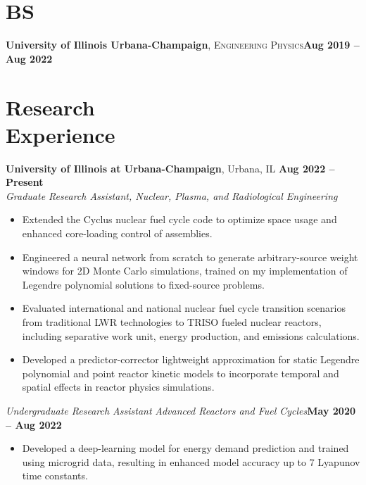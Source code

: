 \documentclass[margin,line]{resume}
\begin{document}
\begin{resume}
    \section{\mysidestyle BS}
    \textbf{University of Illinois Urbana-Champaign}, \textsc{Engineering Physics}\hfill\textbf{Aug 2019 -- Aug 2022}\vspace{-3mm}\\\vspace{-1mm}%
    \vspace{-1.5mm}

\section{\mysidestyle Research\\Experience}
\textbf{University of Illinois at Urbana-Champaign}, Urbana, IL \hfill \textbf{Aug 2022 -- Present} \\
\textsl{Graduate Research Assistant, Nuclear, Plasma, and Radiological Engineering} \\
\begin{itemize}
    \item Extended the Cyclus nuclear fuel cycle code to optimize space usage and enhanced core-loading control of assemblies.
    \item Engineered a neural network from scratch to generate arbitrary-source weight windows for 2D Monte Carlo simulations, trained on my implementation of Legendre polynomial solutions to fixed-source problems.
    \item Evaluated international and national nuclear fuel cycle transition scenarios from traditional LWR technologies to TRISO fueled nuclear reactors, including separative work unit, energy production, and emissions calculations.
    \item Developed a predictor-corrector lightweight approximation for static Legendre polynomial and point reactor kinetic models to incorporate temporal and spatial effects in reactor physics simulations.
\end{itemize}
                \textsl{Undergraduate Research Assistant} \textsl{Advanced Reactors and Fuel Cycles}\hfill \textbf{May 2020 -- Aug 2022}\\
                \begin{itemize}
                    \item Developed a deep-learning model for energy demand prediction and trained using microgrid data, resulting in enhanced model accuracy up to 7 Lyapunov time constants.

\end{itemize}
\end{resume}
\end{document}
